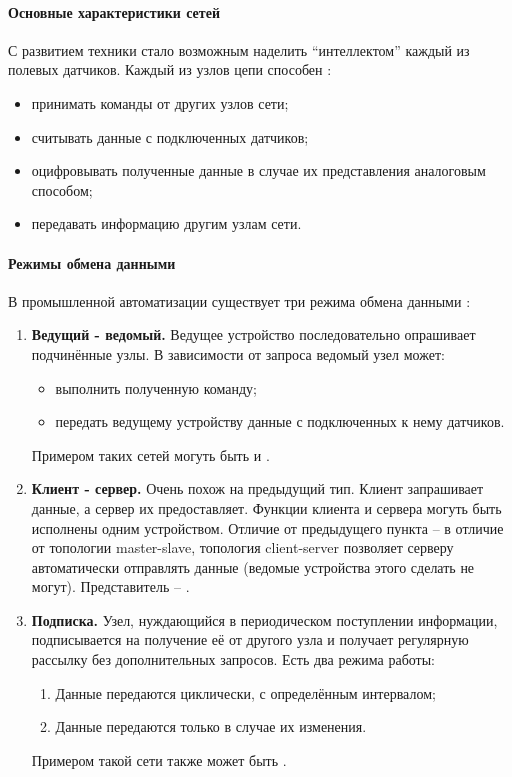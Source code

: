 \paragraph{Основные характеристики сетей}
С развитием техники стало возможным наделить ``интеллектом'' каждый из полевых датчиков. Каждый из узлов цепи способен \cite{__2002}:
\begin{itemize}
	\item принимать команды от других узлов сети;
	\item считывать данные с подключенных датчиков;
	\item оцифровывать полученные данные в случае их представления аналоговым способом;
	\item передавать информацию другим узлам сети.
\end{itemize}
\paragraph{Режимы обмена данными}
В промышленной автоматизации существует три режима обмена данными \cite{__2002, thomesse_fieldbus_2005}:
\begin{enumerate}
	\item \textbf{Ведущий - ведомый.} Ведущее устройство последовательно опрашивает подчинённые узлы. В зависимости от запроса ведомый узел может:
	\begin{itemize}
		\item выполнить полученную команду;
		\item передать ведущему устройству данные с подключенных к нему датчиков.
	\end{itemize}
	Примером таких сетей могуть быть \mb{} и \pb.
	\item \textbf{Клиент - сервер.} Очень похож на предыдущий тип. Клиент запрашивает данные, а сервер их предоставляет. Функции клиента и сервера могуть быть исполнены одним устройством. Отличие от предыдущего пункта -- в отличие от топологии master-slave, топология client-server позволяет серверу автоматически отправлять данные (ведомые устройства этого сделать не могут). Представитель --  \ffb.
	\item \textbf{Подписка.} Узел, нуждающийся в периодическом поступлении информации, подписывается на получение её от другого узла и получает регулярную рассылку без дополнительных запросов. Есть два режима работы:
	\begin{enumerate}
		\item Данные передаются циклически, с определённым интервалом;
		\item Данные передаются только в случае их изменения.
	\end{enumerate}
	Примером такой сети также может быть \ffb.
\end{enumerate}